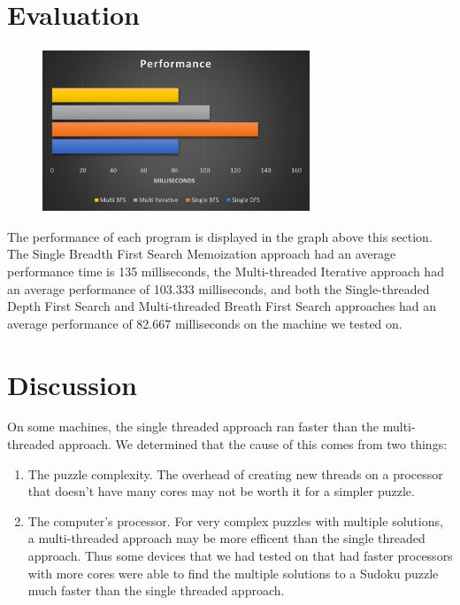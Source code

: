 \documentclass[conference]{IEEEtran}
\begin{document}
\section{Evaluation}
\vspace{1\baselineskip}
\begin{figure}[H]
\centering
\includegraphics[width=8cm,height=4.87cm]{Picture3.png}
\end{figure}
The performance of each program is displayed in the graph above this section. The Single Breadth First Search Memoization approach had an average performance time is 135 milliseconds, the Multi-threaded Iterative approach had an average performance of 103.333 milliseconds, and both the Single-threaded Depth First Search and Multi-threaded Breath First Search approaches had an average performance of 82.667 milliseconds on the machine we tested on.

\section{Discussion}
On some machines, the single threaded approach ran faster than the multi-threaded approach. We determined that the cause of this comes from two things:
\begin{enumerate}
    \item The puzzle complexity. The overhead of creating new threads on a processor that doesn't have many cores may not be worth it for a simpler puzzle.
    \item The computer's processor. For very complex puzzles with multiple solutions, a multi-threaded approach may be more efficent than the single threaded approach. Thus some devices that we had tested on that had faster processors with more cores were able to find the multiple solutions to a Sudoku puzzle much faster than the single threaded approach.
\end{enumerate}
\end{document}
